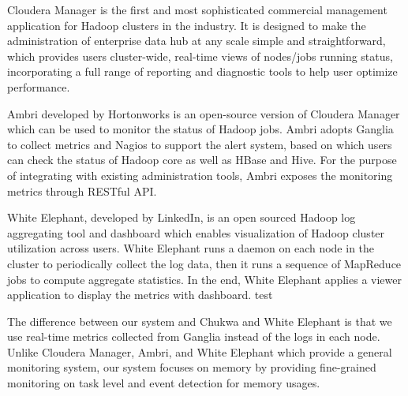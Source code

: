 Cloudera Manager\cite{http://www.cloudera.com} is the first and most sophisticated commercial management application for Hadoop clusters in the industry. 
It is designed to make the administration of enterprise data hub at any scale simple and straightforward, which provides users cluster-wide, real-time views of nodes/jobs running status, incorporating a full range of reporting and diagnostic tools to help user optimize performance.

Ambri\cite{http://hortonworks.com/hadoop/ambari} developed by Hortonworks is an open-source version of Cloudera Manager which can be used to monitor the status of Hadoop jobs.
Ambri adopts Ganglia to collect metrics and Nagios to support the alert system, based on which users can check the status of Hadoop core as well as HBase and Hive.
For the purpose of integrating with existing administration tools, Ambri exposes the monitoring metrics through RESTful API.
\par
White Elephant\cite{http://data.linkedin.com/opensource/white-elephant}, developed by LinkedIn, is an open sourced Hadoop log aggregating tool and dashboard which enables visualization of Hadoop cluster utilization across users. 
White Elephant runs a daemon on each node in the cluster to periodically collect the log data, then it runs a sequence of MapReduce jobs to compute aggregate statistics. In the end, White Elephant applies a viewer application to display the metrics with dashboard. test
\par
The difference between our system and Chukwa and White Elephant is that we use real-time metrics collected from Ganglia instead of the logs in each node.
Unlike Cloudera Manager, Ambri, and White Elephant which provide a general monitoring system, our system focuses on memory by providing fine-grained monitoring on task level and event detection for memory usages.



